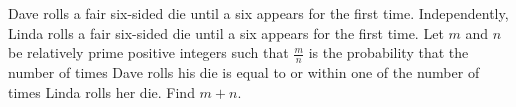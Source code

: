Dave rolls a fair six-sided die until a six appears for the first time. Independently, Linda rolls a fair six-sided die until a six appears for the first time. Let $ m$ and $ n$ be relatively prime positive integers such that $ \frac{m}{n}$ is the probability that the number of times Dave rolls his die is equal to or within one of the number of times Linda rolls her die. Find $ m+n$.